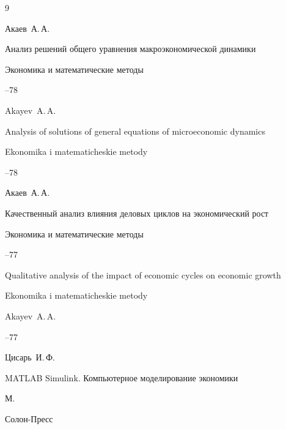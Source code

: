 \begin{thebibliography}{9}




\by Акаев~А.\,А.

\paper Анализ решений общего уравнения макроэкономической динамики 

\jour Экономика  и математические методы




--78

\misctransl

\by Akayev~A.\,A. 

\paper Analysis of solutions of general equations of microeconomic dynamics

\jour Ekonomika i matematicheskie metody




--78




\by Акаев~А.\,А.

\paper Качественный анализ влияния деловых циклов на экономический рост 

\jour Экономика и математические методы




--77

\misctransl

\paper Qualitative analysis of the impact of economic cycles on economic growth

\jour Ekonomika i matematicheskie metody

\by Akayev~A.\,A. 




--77




\by Цисарь~И.\,Ф. 

\book MATLAB Simulink. Компьютерное моделирование экономики 

\publaddr М.

\publ Солон-Пресс


\end{thebibliography}
